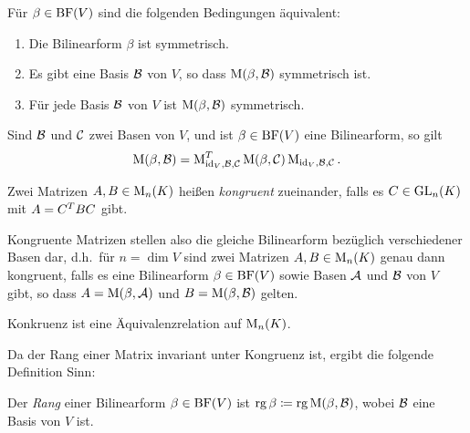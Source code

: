 \begin{lemma}
  Für $\beta \in \operatorname{BF}(V)$ sind die folgenden Bedingungen äquivalent:
  \begin{enumerate}
    \item
      Die Bilinearform $\beta$ ist symmetrisch.
    \item
      Es gibt eine Basis $\mathcal{B}$ von $V$, so dass $\operatorname{M}(\beta, \mathcal{B})$ symmetrisch ist.
    \item
      Für jede Basis $\mathcal{B}$ von $V$ ist $\operatorname{M}(\beta, \mathcal{B})$ symmetrisch.
  \end{enumerate}
\end{lemma}

\begin{lemma}
  Sind $\mathcal{B}$ und $\mathcal{C}$ zwei Basen von $V$, und ist $\beta \in \operatorname{BF}(V)$ eine Bilinearform, so gilt
  \[
      \operatorname{M}(\beta, \mathcal{B})
    = \operatorname{M}_{\operatorname{id}_V, \mathcal{B}, \mathcal{C}}^T
      \operatorname{M}(\beta, \mathcal{C})
      \operatorname{M}_{\operatorname{id}_V, \mathcal{B}, \mathcal{C}}.
  \]
\end{lemma}

\begin{definition}
  Zwei Matrizen $A, B \in \operatorname{M}_{n}(K)$ heißen \emph{kongruent} zueinander, falls es $C \in \operatorname{GL}_{n}(K)$ mit $A = C^T B C$ gibt.
\end{definition}

Kongruente Matrizen stellen also die gleiche Bilinearform bezüglich verschiedener Basen dar, d.h.\ für $n = \dim V$ sind zwei Matrizen $A, B \in \operatorname{M}_{n}(K)$ genau dann kongruent, falls es eine Bilinearform $\beta \in \operatorname{BF}(V)$ sowie Basen $\mathcal{A}$ und $\mathcal{B}$ von $V$ gibt, so dass $A = \operatorname{M}(\beta, \mathcal{A})$ und $B = \operatorname{M}(\beta, \mathcal{B})$ gelten.

\begin{corollary}
  Konkruenz ist eine Äquivalenzrelation auf $\operatorname{M}_{n}(K)$.
\end{corollary}

Da der Rang einer Matrix invariant unter Kongruenz ist, ergibt die folgende Definition Sinn:

\begin{definition}
  Der \emph{Rang} einer Bilinearform $\beta \in \operatorname{BF}(V)$ ist $\operatorname{rg} \beta \coloneqq \operatorname{rg} \operatorname{M}(\beta, \mathcal{B})$, wobei $\mathcal{B}$ eine Basis von $V$ ist.
\end{definition}

